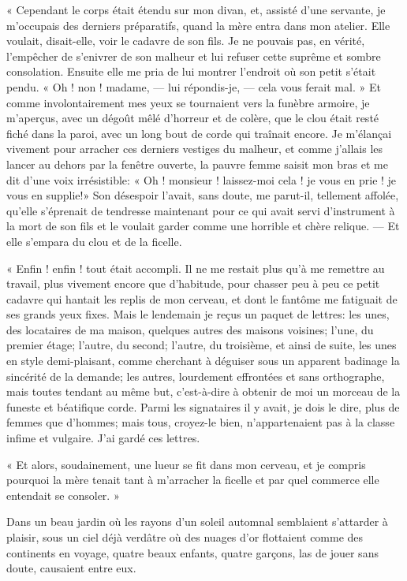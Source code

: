 « Cependant le corps était étendu sur mon divan, et, assisté
d’une servante, je m’occupais des
derniers préparatifs, quand la mère entra dans mon atelier. Elle
voulait, disait{}-elle, voir le cadavre de son fils. Je ne pouvais pas,
en vérité, l’empêcher de s’enivrer de
son malheur et lui refuser cette suprême et sombre consolation. Ensuite
elle me pria de lui montrer l’endroit où son petit
s’était pendu. « Oh ! non ! madame, --- lui
répondis{}-je, --- cela vous ferait mal. » Et comme involontairement mes
yeux se tournaient vers la funèbre armoire, je
m’aperçus, avec un dégoût mêlé
d’horreur et de colère, que le clou était resté fiché
dans la paroi, avec un long bout de corde qui traînait encore. Je
m’élançai vivement pour arracher ces derniers vestiges
du malheur, et comme j’allais les lancer au dehors par
la fenêtre ouverte, la pauvre femme saisit mon bras et me dit
d’une voix irrésistible: « Oh ! monsieur !
laissez{}-moi cela ! je vous en prie ! je vous en supplie!» Son
désespoir l’avait, sans doute, me parut{}-il,
tellement affolée, qu’elle s’éprenait
de tendresse maintenant pour ce qui avait servi
d’instrument à la mort de son fils et le voulait
garder comme une horrible et chère relique. --- Et elle
s’empara du clou et de la ficelle.

« Enfin ! enfin ! tout était accompli. Il ne me restait plus
qu’à me remettre au travail, plus vivement encore que
d’habitude, pour chasser peu à peu ce petit cadavre
qui hantait les replis de mon cerveau, et dont le fantôme me fatiguait
de ses grands yeux fixes. Mais le lendemain je reçus un paquet de
lettres: les unes, des locataires de ma maison, quelques autres des
maisons voisines; l’une, du premier étage;
l’autre, du second; l’autre, du
troisième, et ainsi de suite, les unes en style demi{}-plaisant, comme
cherchant à déguiser sous un apparent badinage la sincérité de la
demande; les autres, lourdement effrontées et sans orthographe, mais
toutes tendant au même but, c’est{}-à{}-dire à obtenir
de moi un morceau de la funeste et béatifique corde. Parmi les
signataires il y avait, je dois le dire, plus de femmes que
d’hommes; mais tous, croyez{}-le bien,
n’appartenaient pas à la classe infime et vulgaire.
J’ai gardé ces lettres.

« Et alors, soudainement, une lueur se fit dans mon cerveau, et je
compris pourquoi la mère tenait tant à m’arracher la
ficelle et par quel commerce elle entendait se consoler. »


Dans un beau jardin où les rayons d’un soleil automnal
semblaient s’attarder à plaisir, sous un ciel déjà
verdâtre où des nuages d’or flottaient comme des
continents en voyage, quatre beaux enfants, quatre garçons, las de
jouer sans doute, causaient entre eux.

